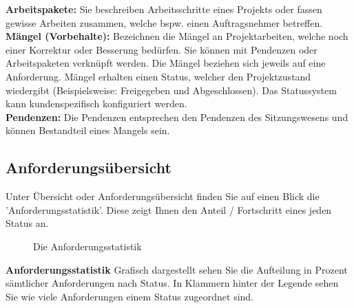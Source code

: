 \textbf{Arbeitspakete:} Sie beschreiben Arbeitsschritte eines Projekts oder fassen gewisse Arbeiten zusammen, welche bspw. einen Auftragsnehmer betreffen. \\

\textbf{Mängel (Vorbehalte):} Bezeichnen die Mängel an Projektarbeiten, welche noch einer Korrektur oder Besserung bedürfen. Sie können mit Pendenzen oder Arbeitspaketen verknüpft werden. Die Mängel beziehen sich jeweils auf eine Anforderung. Mängel erhalten einen Status, welcher den Projektzustand wiedergibt (Beispielsweise: Freigegeben und Abgeschlossen). Das Statussystem kann kundenspezifisch konfiguriert werden. \\

\textbf{Pendenzen:} Die Pendenzen entsprechen den Pendenzen des Sitzungswesens und können Bestandteil eines Mangels sein. 

\pagebreak

\subsection{Anforderungsübersicht}

Unter Übersicht oder Anforderungsübersicht finden Sie auf einen Blick die 'Anforderungsstatistik'. Diese zeigt Ihnen den Anteil / Fortschritt eines jeden Status an.

\begin{figure}[H]
\caption{Die Anforderungsstatistik}
\end{figure}

\textbf{Anforderungsstatistik}
Grafisch dargestellt sehen Sie die Aufteilung in Prozent sämtlicher Anforderungen nach Status. In Klammern hinter der Legende sehen Sie wie viele Anforderungen einem Status zugeordnet sind. \\

